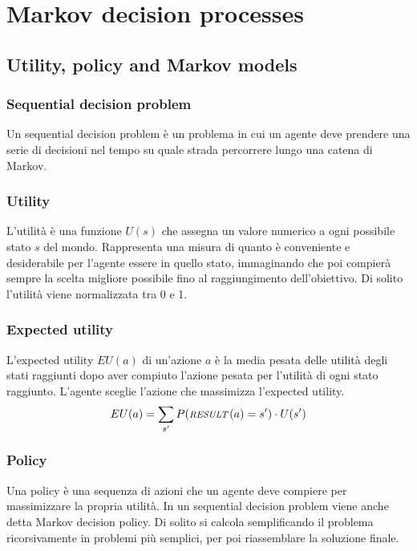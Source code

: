 \section{Markov decision processes}
\subsection{Utility, policy and Markov models}
\subsubsection*{Sequential decision problem}
Un sequential decision problem è un problema in cui un agente deve prendere una serie di decisioni nel tempo su quale strada
percorrere lungo una catena di Markov.

\subsubsection*{Utility}
L'utilità è una funzione \(U(s)\) che assegna un valore numerico a ogni possibile stato \(s\) del mondo. Rappresenta una misura
di quanto è conveniente e desiderabile per l'agente essere in quello stato, immaginando che poi compierà sempre la scelta migliore
possibile fino al raggiungimento dell'obiettivo. Di solito l'utilità viene normalizzata tra 0 e 1.

\subsubsection*{Expected utility}
L'expected utility \(EU(a)\) di un'azione \(a\) è la media pesata delle utilità degli stati raggiunti dopo aver compiuto l'azione
pesata per l'utilità di ogni stato raggiunto. L'agente sceglie l'azione che massimizza l'expected utility.
\[EU(a) = \sum_{s'} P(\textit{\footnotesize RESULT}\,(a) = s') \cdot U(s')\]

\subsubsection*{Policy}
Una policy è una sequenza di azioni che un agente deve compiere per massimizzare la propria utilità. In un sequential decision
problem viene anche detta Markov decision policy. Di solito si calcola semplificando il problema ricorsivamente in problemi più
semplici, per poi riassemblare la soluzione finale.

